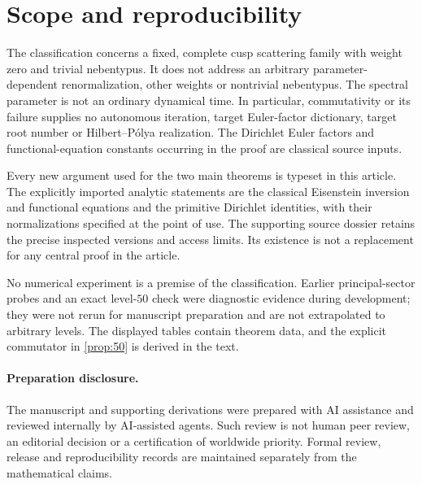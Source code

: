 \section{Scope and reproducibility}\label{sec:scope}

The classification concerns a fixed, complete cusp scattering
family with weight zero and trivial nebentypus. It does not
address an arbitrary parameter-dependent renormalization,
other weights or nontrivial nebentypus. The spectral parameter
is not an ordinary dynamical time. In particular, commutativity
or its failure supplies no autonomous iteration, target
Euler-factor dictionary, target root number or
Hilbert--P\'olya realization. The Dirichlet Euler factors and
functional-equation constants occurring in the proof are
classical source inputs.

Every new argument used for the two main theorems is typeset
in this article. The explicitly imported analytic statements
are the classical Eisenstein inversion and functional
equations and the primitive Dirichlet identities, with their
normalizations specified at the point of use. The supporting
source dossier retains the precise inspected versions and
access limits. Its existence is not a replacement for any
central proof in the article.

No numerical experiment is a premise of the classification.
Earlier principal-sector probes and an exact level-\(50\)
check were diagnostic evidence during development; they
were not rerun for manuscript preparation and are not
extrapolated to arbitrary levels. The displayed tables
contain theorem data, and the explicit commutator in
\cref{prop:50} is derived in the text.

\paragraph{Preparation disclosure.}
The manuscript and supporting derivations were prepared with
AI assistance and reviewed internally by AI-assisted agents.
Such review is not human peer review, an editorial decision
or a certification of worldwide priority. Formal review,
release and reproducibility records are maintained separately
from the mathematical claims.
